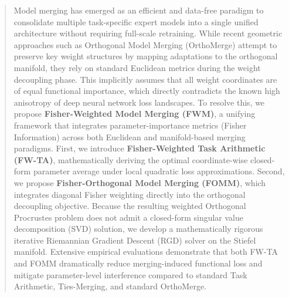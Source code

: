 \documentclass{article}
\theoremstyle{plain}
\theoremstyle{definition}
\theoremstyle{remark}
\begin{document}

\printAffiliationsAndNotice{}

\begin{abstract}
  Model merging has emerged as an efficient and data-free paradigm to consolidate multiple task-specific expert models into a single unified architecture without requiring full-scale retraining. While recent geometric approaches such as Orthogonal Model Merging (OrthoMerge) attempt to preserve key weight structures by mapping adaptations to the orthogonal manifold, they rely on standard Euclidean metrics during the weight decoupling phase. This implicitly assumes that all weight coordinates are of equal functional importance, which directly contradicts the known high anisotropy of deep neural network loss landscapes. To resolve this, we propose \textbf{Fisher-Weighted Model Merging (FWM)}, a unifying framework that integrates parameter-importance metrics (Fisher Information) across both Euclidean and manifold-based merging paradigms. First, we introduce \textbf{Fisher-Weighted Task Arithmetic (FW-TA)}, mathematically deriving the optimal coordinate-wise closed-form parameter average under local quadratic loss approximations. Second, we propose \textbf{Fisher-Orthogonal Model Merging (FOMM)}, which integrates diagonal Fisher weighting directly into the orthogonal decoupling objective. Because the resulting weighted Orthogonal Procrustes problem does not admit a closed-form singular value decomposition (SVD) solution, we develop a mathematically rigorous iterative Riemannian Gradient Descent (RGD) solver on the Stiefel manifold. Extensive empirical evaluations demonstrate that both FW-TA and FOMM dramatically reduce merging-induced functional loss and mitigate parameter-level interference compared to standard Task Arithmetic, Ties-Merging, and standard OrthoMerge.
\end{abstract}
\end{document}
